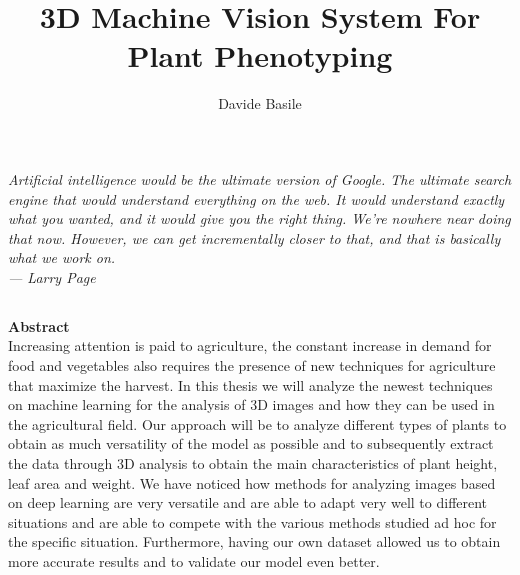 \documentclass[a4paper,12pt,oneside]{book}
\title{3D Machine Vision System For Plant Phenotyping}
\author{Davide Basile}
\theoremstyle{definition}
\theoremstyle{definition}
\newcommand\blankpage{%
	\clearpage
	\thispagestyle{plain}
	\null
	\newpage}
\begin{document}
	

	\thispagestyle{plain}
	
	\frontmatter
	\blankpage
	

	\thispagestyle{plain}
	\null\vspace{\stretch{1}}
	\begin{flushright}
			\slshape
			Artificial intelligence would be the ultimate version of Google.
			The ultimate search engine that would understand everything on the web.
			It would understand exactly what you wanted, and it would give you the
			right thing. We're nowhere near doing that now. However, we can get
			incrementally closer to that, and that is basically what we work on. \\ \medskip
		--- Larry Page
	\end{flushright}
	
	\null
	\blankpage
	
	
	
	\newpage
	

	\thispagestyle{plain}
	\begin{center}
		\chapter*{}
		{\Huge \textbf{Abstract}}\\
		Increasing attention is paid to agriculture, the constant increase in demand for food and vegetables also requires the presence of new techniques for agriculture
		that maximize the harvest. In this thesis we will analyze the newest techniques on machine learning for the analysis of 3D images and how they can be used in the
		agricultural field. Our approach will be to analyze different types of plants to obtain as much versatility of the model as possible and to subsequently extract
		the data through 3D analysis to obtain the main characteristics of plant height, leaf area and weight. We have noticed how methods for analyzing images based
		on deep learning are very versatile and are able to adapt very well to different situations and are able to compete with the various methods studied ad hoc for
		the specific situation. Furthermore, having our own dataset allowed us to obtain more accurate results and to validate our model even better.
		\vspace{15mm}
	\end{center}
	\blankpage	
	
\end{document}
